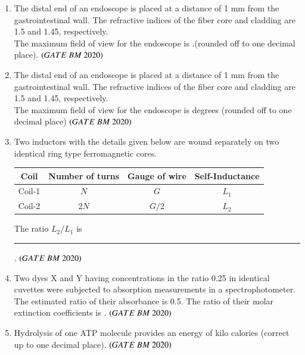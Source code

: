 \documentclass[journal,12pt,onecolumn]{IEEEtran}
\theoremstyle{remark}
\begin{document}
\begin{enumerate}
\item The distal end of an endoscope is placed at a distance of 1 mm from the
gastrointestinal wall. The refractive indices of the fiber core and cladding are 1.5
and 1.45, respectively.\\
The maximum field of view for the endoscope is \underline{\hspace{2cm}}.(rounded off to one decimal place). \hfill $\brak{GATE\ BM\ 2020}$\\

\item The distal end of an endoscope is placed at a distance of 1 mm from the
gastrointestinal wall. The refractive indices of the fiber core and cladding are 1.5
and 1.45, respectively.\\
The maximum field of view for the endoscope is  \underline{\hspace{2cm}} degrees
(rounded off to one decimal place)  \hfill $\brak{GATE\ BM\ 2020}$\\


\item Two inductors with the details given below are wound separately on two identical ring type ferromagnetic cores.
\begin{center}
\begin{tabular}{|c|c|c|c|}
\hline
\textbf{Coil} & \textbf{Number of turns} & \textbf{Gauge of wire} & \textbf{Self-Inductance} \\
\hline
Coil-1 & $N$ & $G$ & $L_1$ \\
\hline
Coil-2 & $2N$ & $G/2$ & $L_2$ \\
\hline
\end{tabular}
\end{center}

The ratio $L_2 / L_1$ is \rule{3cm}{0.15mm}.  \hfill $\brak{GATE\ BM\ 2020}$\\

\item Two dyes X and Y having concentrations in the ratio 0.25 in identical cuvettes were
subjected to absorption measurements in a spectrophotometer. The estimated ratio
of their absorbance is 0.5. The ratio of their molar extinction coefficients is \underline{\hspace{2cm}}.  \hfill $\brak{GATE\ BM\ 2020}$\\

\item Hydrolysis of one ATP molecule provides an energy of \underline{\hspace{2cm}} kilo calories (correct up to one decimal place). \hfill $\brak{GATE\ BM\ 2020}$\\


\end{enumerate}
\end{document}
